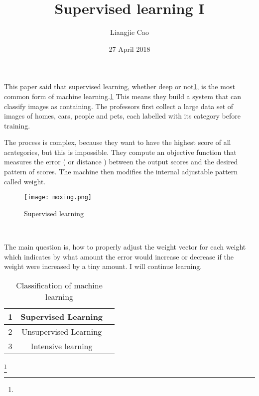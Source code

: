 \documentclass[50pt]{article}
\begin{document}
\title{Supervised learning I}
\author{Liangjie Cao}
\date{27 April 2018}
\maketitle
\par
This paper said that supervised learning, whether deep or not\ref{Figure}, is the most common form of machine learning.\ref{Table} This means they build a system that can classify images as containing. The professors first collect a large data set of images of homes, cars, people and pets, each labelled with its category before training. \\
\par
The process is complex, because they want to have the highest score of all acategories, but this is impossible. They compute an objective function that measures the error ( or distance ) between the output scores and the desired pattern of scores.\cite{name1} The machine then modifies the internal adjustable pattern called weight.
 \begin{figure}[ht]
 \centering
 \texttt{[image: moxing.png]}\\
 \caption{Supervised learning}\label{Figure}
\end{figure}\\
\par
The main question is, how to properly adjust the weight vector for each weight which indicates by what amount the error would increase or decrease if the weight were increased by a tiny amount. I will continue learning. \\
 \begin{table}[!htbp]
  \centering
 \begin{tabular}{|c|c|c|}
    \hline
    1 & Supervised Learning\\
  \hline
    2 & Unsupervised Learning\\
  \hline
   3 &  Intensive learning\\
   \hline
  \end{tabular}
  \caption{Classification of machine learning}\label{Table}
  \end{table}
\footnote{
}
\end{document}
